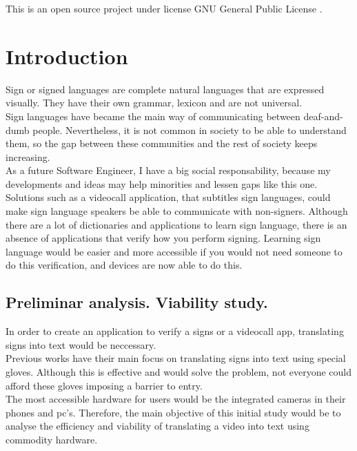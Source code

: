 This is an open source project under license GNU General Public License \cite{gplv3}. \\

\chapter{Introduction}

Sign or signed languages are complete natural languages that are expressed visually.
They have their own grammar, lexicon and are not universal. \\ 

Sign languages have became the main way of communicating between deaf-and-dumb people. Nevertheless,
it is not common in society to be able to understand them, so the gap between these communities
and the rest of society keeps increasing. \\

As a future Software Engineer, I have a big social responsability, because my developments and ideas
may help minorities and lessen gaps like this one. \\

Solutions such as a videocall application, that subtitles sign languages, could make sign language 
speakers be able to communicate with non-signers.
Although there are a lot of dictionaries and applications to learn sign language, there is an 
absence of applications that verify how you perform signing.
Learning sign language would be easier and more accessible if you would not need someone to do this verification,
and devices are now able to do this.

\section{Preliminar analysis. Viability study.}

In order to create an application to verify a signs or a videocall app, 
translating signs into text would be neccessary. \\

Previous works have their main focus on translating signs into text using special gloves. Although this is effective 
and would solve the problem, not everyone could afford these gloves imposing a barrier to entry. \\

The most accessible hardware for users would be the integrated cameras in their phones and pc's. Therefore,
the main objective of this initial study would be to analyse the efficiency and viability of translating 
a video into text using commodity hardware.

